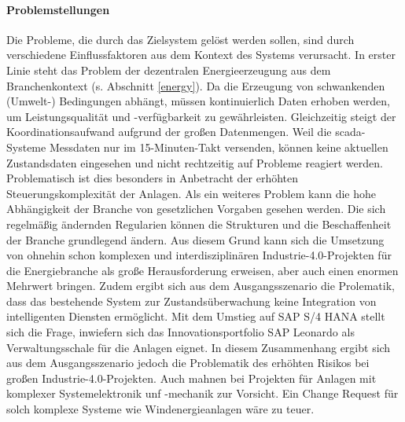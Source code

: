 \paragraph{Problemstellungen}
Die Probleme, die durch das Zielsystem gelöst werden sollen, sind durch verschiedene Einflussfaktoren aus dem Kontext des Systems verursacht. In erster Linie steht das Problem der dezentralen Energieerzeugung aus dem Branchenkontext (s. Abschnitt \ref{energy}). Da die Erzeugung von schwankenden (Umwelt-) Bedingungen abhängt, müssen kontinuierlich Daten erhoben werden, um Leistungsqualität und -verfügbarkeit zu gewährleisten. Gleichzeitig steigt der Koordinationsaufwand aufgrund der großen Datenmengen. Weil die \ac{scada}-Systeme Messdaten nur im 15-Minuten-Takt versenden, können keine aktuellen Zustandsdaten eingesehen und nicht rechtzeitig auf Probleme reagiert werden. Problematisch ist dies besonders in Anbetracht der erhöhten Steuerungskomplexität der Anlagen.
Als ein weiteres Problem kann die hohe Abhängigkeit der Branche von gesetzlichen Vorgaben gesehen werden. Die sich regelmäßig ändernden Regularien können die Strukturen und die Beschaffenheit der Branche grundlegend ändern. Aus diesem Grund kann sich die Umsetzung von ohnehin schon komplexen und interdisziplinären Industrie-4.0-Projekten für die Energiebranche als große Herausforderung erweisen, aber auch einen enormen Mehrwert bringen. Zudem ergibt sich aus dem Ausgangsszenario die Prolematik, dass das bestehende System zur Zustandsüberwachung keine Integration von intelligenten Diensten ermöglicht. Mit dem Umstieg auf SAP S/4 HANA stellt sich die Frage, inwiefern sich das  Innovationsportfolio SAP Leonardo als Verwaltungsschale für die Anlagen eignet. In diesem Zusammenhang ergibt sich aus dem Ausgangsszenario jedoch die Problematik des erhöhten Risikos bei großen Industrie-4.0-Projekten. Auch \citet{Lauenroth2016} mahnen bei Projekten für Anlagen mit komplexer Systemelektronik unf -mechanik zur Vorsicht. Ein Change Request für solch komplexe Systeme wie Windenergieanlagen wäre zu teuer.

